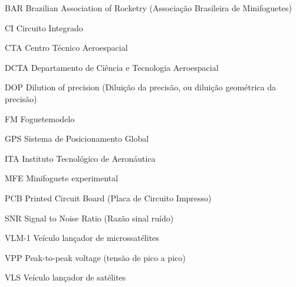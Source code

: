 

\begin{siglas}




\item[BAR] Brazilian Association of Rocketry (Associação Brasileira de Minifoguetes)
\item[CI] Circuito Integrado
\item[CTA] Centro Técnico Aeroespacial 
\item[DCTA] Departamento de Ciência e Tecnologia Aeroespacial 
\item[DOP] Dilution of precision (Diluição da precisão, ou diluição geométrica da precisão)
\item[FM] Foguetemodelo 
\item[GPS] Sistema de Posicionamento Global 
\item[ITA]  Instituto Tecnológico de Aeronáutica
\item[MFE] Minifoguete experimental 
\item[PCB] Printed Circuit Board (Placa de Circuito Impresso)
\item[SNR] Signal to Noise Ratio (Razão sinal ruído) 
\item[VLM-1] Veículo lançador de microssatélites
\item[VPP] Peak-to-peak voltage (tensão de pico a pico)
\item[VLS] Veículo lançador de satélites



\end{siglas}

